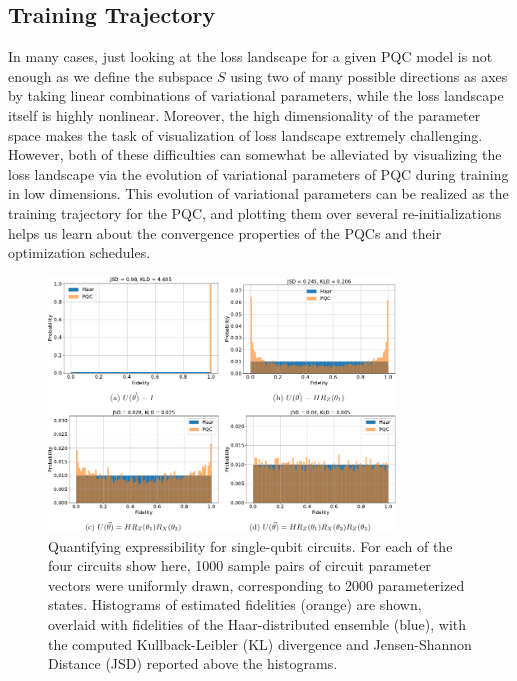 \subsection{Training Trajectory}

In many cases, just looking at the loss landscape for a given PQC model is not enough as we define the subspace $S$ using two of many possible directions as axes by taking linear combinations of variational parameters, while the loss landscape itself is highly nonlinear. Moreover, the high dimensionality of the parameter space makes the task of visualization of loss landscape extremely challenging. However, both of these difficulties can somewhat be alleviated by visualizing the loss landscape via the evolution of variational parameters of PQC during training in low dimensions. This evolution of variational parameters can be realized as the training trajectory for the PQC, and plotting them over several re-initializations helps us learn about the convergence properties of the PQCs and their optimization schedules. 

\begin{figure}[!tp]
    \centering
    \includegraphics[width=0.82\textwidth]{figures/qleet/expressibility.pdf}
    \caption[Quantifying expressibility for single-qubit circuits]{Quantifying expressibility for single-qubit circuits. For each of the four circuits show here, 1000 sample pairs of circuit parameter vectors were uniformly drawn, corresponding to 2000 parameterized states. Histograms of estimated fidelities (orange) are shown, overlaid with fidelities of the Haar-distributed ensemble (blue), with the computed Kullback-Leibler (KL) divergence and Jensen-Shannon Distance (JSD) reported above the histograms.}
    \label{fig:expressibility}
\end{figure}

